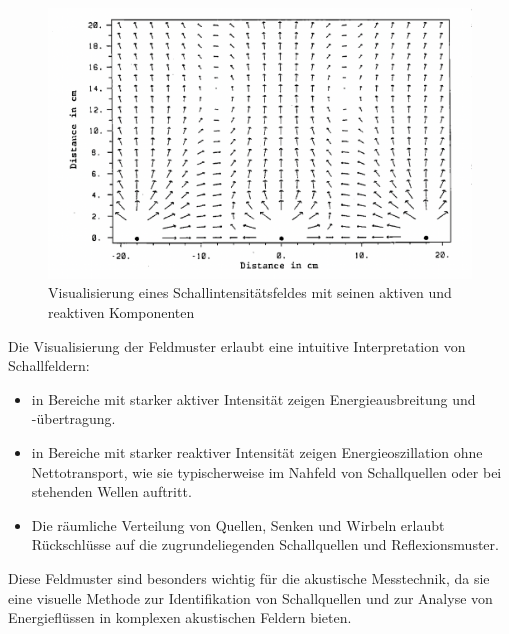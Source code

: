 \begin{figure}[h!]
\centering
\includegraphics[scale=0.4]{papers/helmholtz/images/aktiveSchallintensitaet.png}
\caption{Visualisierung eines Schallintensitätsfeldes mit seinen aktiven und reaktiven Komponenten}
\label{fig:Schallintensitaet}
\end{figure}
 
Die Visualisierung der Feldmuster erlaubt eine intuitive Interpretation von Schallfeldern:
 
\begin{itemize}
\item in Bereiche mit starker aktiver Intensität zeigen Energieausbreitung und -übertragung.
\item in Bereiche mit starker reaktiver Intensität zeigen Energieoszillation ohne Nettotransport, wie sie typischerweise im Nahfeld von Schallquellen oder bei stehenden Wellen auftritt.
\item Die räumliche Verteilung von Quellen, Senken und Wirbeln erlaubt Rückschlüsse auf die zugrundeliegenden Schallquellen und Reflexionsmuster.
\end{itemize}
 
\noindent Diese Feldmuster sind besonders wichtig für die akustische Messtechnik, da sie eine visuelle Methode zur Identifikation von Schallquellen und zur Analyse von Energieflüssen in komplexen akustischen Feldern bieten.


